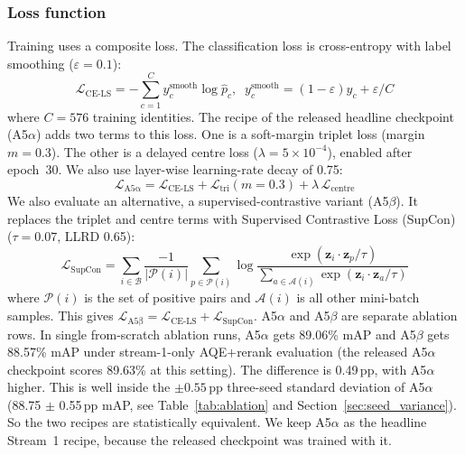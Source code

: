 \subsubsection{Loss function}
Training uses a composite loss. The classification loss is cross-entropy
with label smoothing ($\varepsilon = 0.1$):
\begin{equation}
  \mathcal{L}_{\mathrm{CE\text{-}LS}} =
    -\sum_{c=1}^{C} y_c^{\mathrm{smooth}} \log \hat{p}_c, \;\;
    y_c^{\mathrm{smooth}} = (1{-}\varepsilon)y_c + \varepsilon/C
  \label{eq:cels}
\end{equation}
where $C = 576$ training identities. The recipe of the released headline checkpoint
(A5$\alpha$) adds two terms to this loss. One is a soft-margin triplet loss
(margin $m{=}0.3$). The other is a delayed centre loss ($\lambda{=}5\times10^{-4}$),
enabled after epoch~30. We also use layer-wise learning-rate decay of 0.75:
\begin{equation}
  \mathcal{L}_{\mathrm{A5\alpha}} =
    \mathcal{L}_{\mathrm{CE\text{-}LS}}
    + \mathcal{L}_{\mathrm{tri}}(m{=}0.3)
    + \lambda\,\mathcal{L}_{\mathrm{centre}}
  \label{eq:a5alpha}
\end{equation}
We also evaluate an alternative, a supervised-contrastive variant (A5$\beta$).
It replaces the triplet and centre terms with Supervised Contrastive Loss
(SupCon)~\cite{khosla2020supcon} ($\tau = 0.07$, LLRD 0.65):
\begin{equation}
  \mathcal{L}_{\mathrm{SupCon}} =
    \sum_{i \in \mathcal{B}}
      \frac{-1}{|\mathcal{P}(i)|}
      \sum_{p \in \mathcal{P}(i)}
        \log
        \frac{\exp(\mathbf{z}_i \cdot \mathbf{z}_p / \tau)}
             {\sum_{a \in \mathcal{A}(i)} \exp(\mathbf{z}_i \cdot \mathbf{z}_a / \tau)}
  \label{eq:supcon}
\end{equation}
where $\mathcal{P}(i)$ is the set of positive pairs and $\mathcal{A}(i)$ is all
other mini-batch samples. This gives
$\mathcal{L}_{\mathrm{A5\beta}} = \mathcal{L}_{\mathrm{CE\text{-}LS}} +
\mathcal{L}_{\mathrm{SupCon}}$. A5$\alpha$ and A5$\beta$ are separate ablation rows.
In single from-scratch ablation runs, A5$\alpha$ gets 89.06\% mAP and A5$\beta$ gets 88.57\% mAP
under stream-1-only AQE$+$rerank evaluation (the released A5$\alpha$ checkpoint scores 89.63\% at this setting). The difference is 0.49\,pp, with A5$\alpha$ higher.
This is well inside the $\pm 0.55$\,pp three-seed standard deviation of
A5$\alpha$ (88.75 $\pm$ 0.55\,pp mAP, see Table~\ref{tab:ablation} and
Section~\ref{sec:seed_variance}). So the two recipes are statistically equivalent.
We keep A5$\alpha$ as the headline Stream~1 recipe, because the released checkpoint was trained with it.

